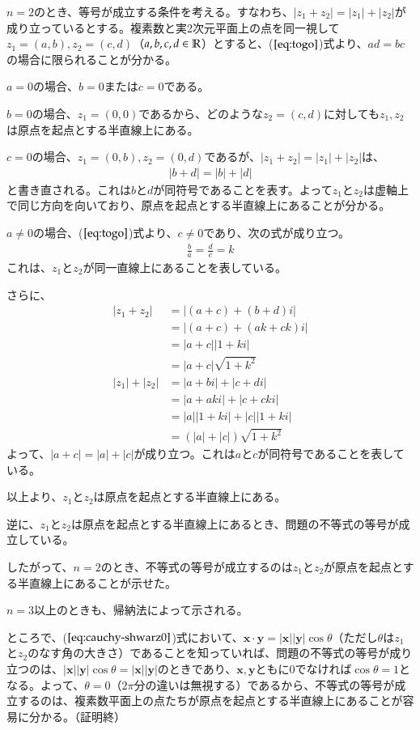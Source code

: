 $n=2$のとき、等号が成立する条件を考える。すなわち、$|z_1+z_2|=|z_1|+|z_2|$が成り立っているとする。複素数と実2次元平面上の点を同一視して$z_1=(a,b), z_2=(c,d)$（$a,b,c,d\in\mathbb{R}$）とすると、($\ref{eq:togo}$)式より、$ad=bc$の場合に限られることが分かる。

$a=0$の場合、$b=0$または$c=0$である。

$b=0$の場合、$z_1=(0,0)$であるから、どのような$z_2=(c,d)$に対しても$z_1, z_2$は原点を起点とする半直線上にある。

$c=0$の場合、$z_1=(0,b), z_2=(0,d)$であるが、$|z_1+z_2|=|z_1|+|z_2|$は、
\begin{align*}
    |b+d|=|b|+|d|
\end{align*}
と書き直される。これは$b$と$d$が同符号であることを表す。よって$z_1$と$z_2$は虚軸上で同じ方向を向いており、原点を起点とする半直線上にあることが分かる。

$a\neq 0$の場合、($\ref{eq:togo}$)式より、$c\neq 0$であり、次の式が成り立つ。
\begin{align*}
    \frac{b}{a}=\frac{d}{c}=k
\end{align*}
これは、$z_1$と$z_2$が同一直線上にあることを表している。

さらに、
\begin{align*}
    |z_1+z_2|&=|(a+c)+(b+d)i|\\
    &=|(a+c)+(ak+ck)i|\\
    &=|a+c||1+ki|\\
    &=|a+c|\sqrt{1+k^2}\\
    |z_1|+|z_2|&=|a+bi|+|c+di|\\
    &=|a+aki|+|c+cki|\\
    &=|a||1+ki|+|c||1+ki|\\
    &=(|a|+|c|)\sqrt{1+k^2}
\end{align*}
よって、$|a+c|=|a|+|c|$が成り立つ。これは$a$と$c$が同符号であることを表している。

以上より、$z_1$と$z_2$は原点を起点とする半直線上にある。

逆に、$z_1$と$z_2$は原点を起点とする半直線上にあるとき、問題の不等式の等号が成立している。

したがって、$n=2$のとき、不等式の等号が成立するのは$z_1$と$z_2$が原点を起点とする半直線上にあることが示せた。

$n=3$以上のときも、帰納法によって示される。

ところで、($\ref{eq:cauchy-shwarz0}$)式において、$\bm{x}\cdot \bm{y}=|\bm{x}||\bm{y}|\cos \theta$（ただし$\theta$は$z_1$と$z_2$のなす角の大きさ）であることを知っていれば、問題の不等式の等号が成り立つのは、$|\bm{x}||\bm{y}|\cos \theta=|\bm{x}||\bm{y}|$のときであり、$\bm{x}, \bm{y}$ともに0でなければ$\cos \theta=1$となる。よって、$\theta=0$（$2\pi$分の違いは無視する）であるから、不等式の等号が成立するのは、複素数平面上の点たちが原点を起点とする半直線上にあることが容易に分かる。（証明終）

